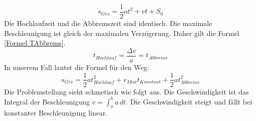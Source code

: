 \documentclass[10pt,a4paper,oneside,abstracton]{scrartcl}
\begin{document}
\begin{equation}
	s_{Ges} =  \frac{1}{2} a t^2 + v t +S_0
	\label{Formel Weg}
\end{equation}
Die Hochlaufzeit und die Abbremszeit sind identisch. 
\newline 
Die maximale Beschleunigung ist gleich der maximalen Verzögerung. 
Daher gilt die Formel \ref*{Formel TAbbrems}. 
\newline 
\begin{equation}
	t_{Hochlauf} = \frac{\Delta v}{a} = t_{Abbrems}
	\label{Formel TAbbrems}
\end{equation}
In unserem Fall lautet die Formel für den Weg:
\begin{equation}
	s_{Ges} =  \frac{1}{2} a t^2_{Hochlauf} + v_{Max} t_{Konstant} + \frac{1}{2} a t^2_{Abbrems} 
	\label{Formel Weg Beispiel}
\end{equation}
Die Problemstellung sieht schmetisch wie folgt aus. 
Die Geschwindigkeit ist das Integral der Beschleunigung $ v = $\(\int_{a}^{b} a \,dt\). Die Geschwindigkeit steigt und fällt bei konstanter Beschleunigung linear. 
\newline
\end{document}
